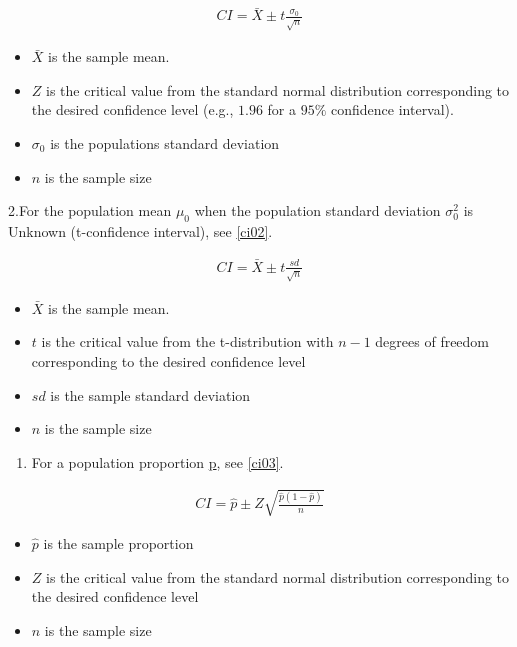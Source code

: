 \documentclass[
  a4paper,
]{scrbook}
\providecommand{\tightlist}{%
  \setlength{\itemsep}{0pt}\setlength{\parskip}{0pt}}\usepackage{longtable,booktabs,array}
\begin{document}
\begin{align}
CI = \bar{X} \pm t \frac{\sigma_0}{\sqrt{n}} \label{ci01}
\end{align}

\begin{itemize}
\item
  \(\bar{X}\) is the sample mean.
\item
  \(Z\) is the critical value from the standard normal distribution
  corresponding to the desired confidence level (e.g., \(1.96\) for a
  \(95\%\) confidence interval).
\item
  \(\sigma_0\) is the populations standard deviation
\item
  \(n\) is the sample size
\end{itemize}

2.For the population mean \hyperref[truemean-gloss]{\(\mu_0\)} when the
population standard deviation
\hyperref[truevariance-gloss]{\(\sigma_0^2\)} is Unknown (t-confidence
interval), see \eqref{ci02}.

\begin{align}
CI = \bar{X} \pm t \frac{sd}{\sqrt{n}} \label{ci02}
\end{align}

\begin{itemize}
\item
  \(\bar{X}\) is the sample mean.
\item
  \(t\) is the critical value from the t-distribution with \(n-1\)
  degrees of freedom corresponding to the desired confidence level
\item
  \(sd\) is the sample standard deviation
\item
  \(n\) is the sample size
\end{itemize}

\begin{enumerate}
\def\labelenumi{\arabic{enumi}.}
\setcounter{enumi}{2}
\tightlist
\item
  For a population proportion \hyperref[popprop-gloss]{p}, see
  \eqref{ci03}.
\end{enumerate}

\begin{align}
CI = \hat{p} \pm Z \sqrt{\frac{\hat{p}(1-\hat{p})}{n}} \label{ci03}
\end{align}

\begin{itemize}
\item
  \(\hat{p}\) is the sample proportion
\item
  \(Z\) is the critical value from the standard normal distribution
  corresponding to the desired confidence level
\item
  \(n\) is the sample size
\end{itemize}
\end{document}
